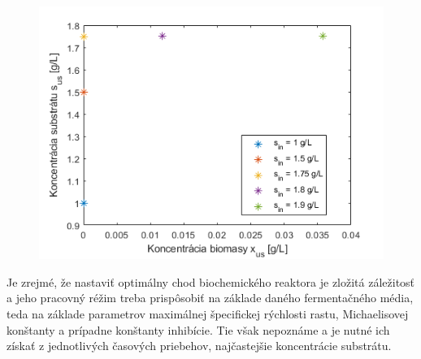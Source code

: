 \begin{figure}[H]
	\centering
	\includegraphics[width=.8\linewidth]{images/s_in_inhb}
	\caption[]{}
	\label{fig:7}
\end{figure}

Je zrejmé, že nastaviť optimálny chod biochemického reaktora je zložitá záležitosť a jeho pracovný réžim treba prispôsobiť na základe daného fermentačného média, teda na základe parametrov maximálnej špecifickej rýchlosti rastu, Michaelisovej konštanty a prípadne konštanty inhibície. Tie však nepoznáme a je nutné ich získať z jednotlivých časových priebehov, najčastejšie koncentrácie substrátu.